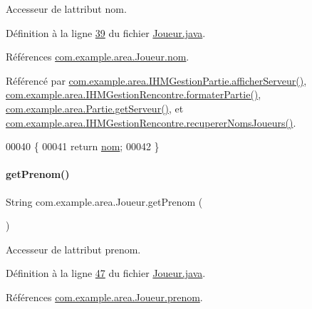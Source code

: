 Accesseur de l\textquotesingle{}attribut nom. 



Définition à la ligne \hyperlink{_joueur_8java_source_l00039}{39} du fichier \hyperlink{_joueur_8java_source}{Joueur.\+java}.



Références \hyperlink{_joueur_8java_source_l00023}{com.\+example.\+area.\+Joueur.\+nom}.



Référencé par \hyperlink{_i_h_m_gestion_partie_8java_source_l00447}{com.\+example.\+area.\+I\+H\+M\+Gestion\+Partie.\+afficher\+Serveur()}, \hyperlink{_i_h_m_gestion_rencontre_8java_source_l00343}{com.\+example.\+area.\+I\+H\+M\+Gestion\+Rencontre.\+formater\+Partie()}, \hyperlink{_partie_8java_source_l00334}{com.\+example.\+area.\+Partie.\+get\+Serveur()}, et \hyperlink{_i_h_m_gestion_rencontre_8java_source_l00281}{com.\+example.\+area.\+I\+H\+M\+Gestion\+Rencontre.\+recuperer\+Noms\+Joueurs()}.


\begin{DoxyCode}
00040       \{
00041           \textcolor{keywordflow}{return} \hyperlink{classcom_1_1example_1_1area_1_1_joueur_a98dde75942f6a48d9acf0abb67742dc3}{nom};
00042       \}
\end{DoxyCode}
\mbox{\label{classcom_1_1example_1_1area_1_1_joueur_ac2cd099ccfc34c48fbabde5649514a27}} 
\paragraph{\texorpdfstring{get\+Prenom()}{getPrenom()}}
{\footnotesize\ttfamily String com.\+example.\+area.\+Joueur.\+get\+Prenom (\begin{DoxyParamCaption}{ }\end{DoxyParamCaption})}



Accesseur de l\textquotesingle{}attribut prenom. 



Définition à la ligne \hyperlink{_joueur_8java_source_l00047}{47} du fichier \hyperlink{_joueur_8java_source}{Joueur.\+java}.



Références \hyperlink{_joueur_8java_source_l00024}{com.\+example.\+area.\+Joueur.\+prenom}.




